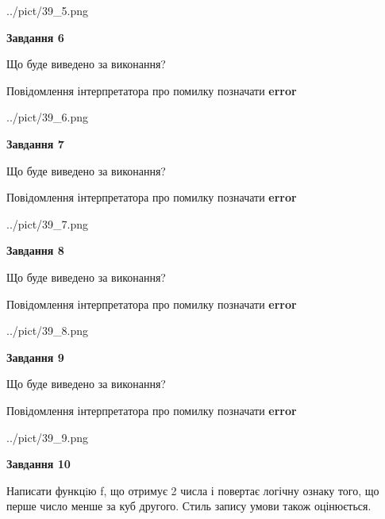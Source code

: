\documentclass[12pt, ukrainian]{article}
\begin{document}
{\begin {large}
\begin{center}
	{../pict/39_5.png}
\end{center}
\newpage

{\begin {center}\textbf{Завдання 6}\end {center}}\par
Що буде виведено за виконання? \par
Повідомлення інтерпретатора про помилку позначати \textbf{error}

\begin{center}
	{../pict/39_6.png}
\end{center}
\newpage

{\begin {center}\textbf{Завдання 7}\end {center}}\par
Що буде виведено за виконання? \par
Повідомлення інтерпретатора про помилку позначати \textbf{error}

\begin{center}
	{../pict/39_7.png}
\end{center}
\newpage

{\begin {center}\textbf{Завдання 8}\end {center}}\par
Що буде виведено за виконання? \par
Повідомлення інтерпретатора про помилку позначати \textbf{error}

\begin{center}
	{../pict/39_8.png}
\end{center}
\newpage

{\begin {center}\textbf{Завдання 9}\end {center}}\par
Що буде виведено за виконання? \par
Повідомлення інтерпретатора про помилку позначати \textbf{error}

\begin{center}
	{../pict/39_9.png}
\end{center}
\newpage

{\begin {center}\textbf{Завдання 10}\end {center}}\par

Написати функцiю f, що отримує 2 числа і повертає логічну ознаку того, що перше число менше за куб другого. Стиль запису умови також оцінюється.\par
\newpage

\end {large}}
\end{document}
